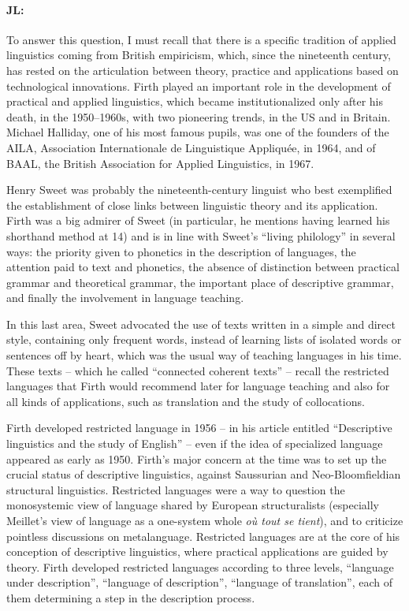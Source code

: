 \documentclass[output=paper]{langscibook}
\begin{document}
\paragraph*{JL:} To answer this question, I must recall that there is a specific tradition of applied linguistics coming from British empiricism, which, since the nineteenth century, has rested on the articulation between theory, practice and applications based on technological innovations. Firth played an important role in the development of practical and applied linguistics, which became institutionalized only after his death, in the 1950–1960s, with two pioneering trends, in the US and in Britain. Michael Halliday, one of his most famous pupils, was one of the founders of the AILA, Association Internationale de Linguistique Appliquée, in 1964, and of BAAL, the British Association for Applied Linguistics, in 1967.

Henry Sweet was probably the nineteenth-century linguist who best exemplified the establishment of close links between linguistic theory and its application. Firth was a big admirer of Sweet (in particular, he mentions having learned his shorthand method at 14) and is in line with Sweet’s “living philology” in several ways: the priority given to phonetics in the description of languages, the attention paid to text and phonetics, the absence of distinction between practical grammar and theoretical grammar, the important place of descriptive grammar, and finally the involvement in language teaching. 

In this last area, Sweet advocated the use of texts written in a simple and direct style, containing only frequent words, instead of learning lists of isolated words or sentences off by heart, which was the usual way of teaching languages in his time. These texts – which he called “connected coherent texts” – recall the restricted languages that Firth would recommend later for language teaching and also for all kinds of applications, such as translation and the study of collocations. 

Firth developed restricted language in 1956 – in his article entitled “Descriptive linguistics and the study of English” – even if the idea of specialized language appeared as early as 1950. Firth’s major concern at the time was to set up the crucial status of descriptive linguistics, against Saussurian and Neo-Bloomfieldian structural linguistics. Restricted languages were a way to question the monosystemic view of language shared by European structuralists (especially Meillet’s view of language as a one-system whole \textit{où tout se tient}), and to criticize pointless discussions on metalanguage. Restricted languages are at the core of his conception of descriptive linguistics, where practical applications are guided by theory. Firth developed restricted languages according to three levels, “language under description”, “language of description”, “language of translation”, each of them determining a step in the description process.
\end{document}

